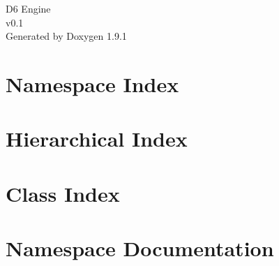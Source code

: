 \let\mypdfximage\pdfximage\def\pdfximage{\immediate\mypdfximage}\documentclass[twoside]{book}
\newcommand{\+}{\discretionary{\mbox{\scriptsize$\hookleftarrow$}}{}{}}
\newcommand{\clearemptydoublepage}{%
  \newpage{\pagestyle{empty}\cleardoublepage}%
}
\begin{document}
\raggedbottom

\hypersetup{pageanchor=false,
             bookmarksnumbered=true,
             pdfencoding=unicode
            }
\begin{titlepage}
\vspace*{7cm}
\begin{center}%
{\Large D6 Engine \\[1ex]\large v0.\+1 }\\
\vspace*{1cm}
{\large Generated by Doxygen 1.9.1}\\
\end{center}
\end{titlepage}
\clearemptydoublepage
{}
\tableofcontents
\clearemptydoublepage
{}
\hypersetup{pageanchor=true}

\chapter{Namespace Index}

\chapter{Hierarchical Index}

\chapter{Class Index}

\chapter{Namespace Documentation}





\end{document}
